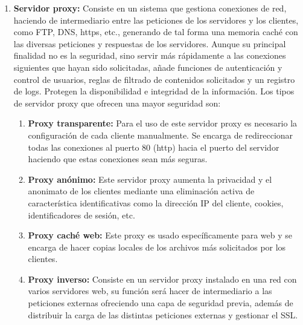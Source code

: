 \begin{enumerate}
\begin{enumerate}
\begin{figure}[tphb]
\end{figure}
\end{enumerate}
\item {\bfseries Servidor proxy:}
Consiste en un sistema que gestiona conexiones de red, haciendo de intermediario entre las peticiones de los servidores y los clientes, como FTP, DNS, https, etc., generando de tal forma una memoria caché con las diversas peticiones y respuestas de los servidores. Aunque su principal finalidad no es la seguridad, sino servir más rápidamente a las conexiones siguientes que hayan sido solicitadas, añade funciones de autenticación y control de usuarios, reglas de filtrado de contenidos solicitados y un registro de logs. Protegen la disponibilidad e integridad de la información. Los tipos de servidor proxy que ofrecen una mayor seguridad son:
\begin{enumerate}
\item {\bfseries Proxy transparente:}
Para el uso de este servidor proxy es necesario la configuración de cada cliente manualmente. Se encarga de redireccionar todas las conexiones al puerto 80 (http) hacia el puerto del servidor haciendo que estas conexiones sean más seguras.
\item {\bfseries Proxy anónimo:} 
Este servidor proxy aumenta la privacidad y el anonimato de los clientes mediante una eliminación activa de característica identificativas como la dirección IP del cliente, cookies, identificadores de sesión, etc.\cite{proxy2}
\item {\bfseries Proxy caché web:}
 Este proxy es usado específicamente para web y se encarga de hacer copias locales de los archivos más solicitados por los clientes.
\item {\bfseries Proxy inverso:}
 Consiste en un servidor proxy instalado en una red con varios servidores web, su función será hacer de intermediario a las peticiones externas ofreciendo una capa de seguridad previa, además de distribuir la carga de las distintas peticiones externas y gestionar el SSL.\cite{proxy}
\end{enumerate}
\end{enumerate}
